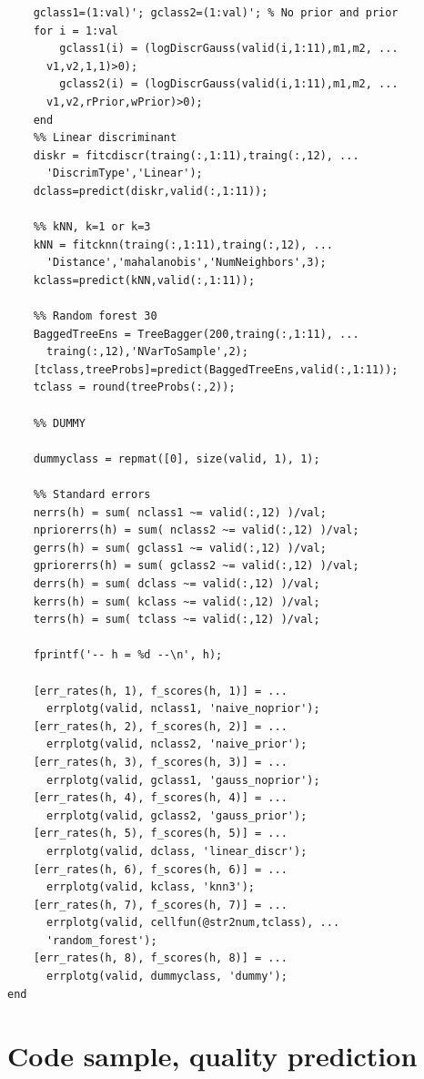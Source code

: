 \documentclass[twoside]{article}
\begin{document}
\begin{multicols}{2}
{\begin{verbatim}
    gclass1=(1:val)'; gclass2=(1:val)'; % No prior and prior
    for i = 1:val
        gclass1(i) = (logDiscrGauss(valid(i,1:11),m1,m2, ... 
	  v1,v2,1,1)>0);
        gclass2(i) = (logDiscrGauss(valid(i,1:11),m1,m2, ...
	  v1,v2,rPrior,wPrior)>0);
    end 
    %% Linear discriminant
    diskr = fitcdiscr(traing(:,1:11),traing(:,12), ...
      'DiscrimType','Linear');
    dclass=predict(diskr,valid(:,1:11));

    %% kNN, k=1 or k=3
    kNN = fitcknn(traing(:,1:11),traing(:,12), ...
      'Distance','mahalanobis','NumNeighbors',3);
    kclass=predict(kNN,valid(:,1:11));

    %% Random forest 30
    BaggedTreeEns = TreeBagger(200,traing(:,1:11), ...
      traing(:,12),'NVarToSample',2);
    [tclass,treeProbs]=predict(BaggedTreeEns,valid(:,1:11));
    tclass = round(treeProbs(:,2));
    
    %% DUMMY

    dummyclass = repmat([0], size(valid, 1), 1);

    %% Standard errors
    nerrs(h) = sum( nclass1 ~= valid(:,12) )/val;
    npriorerrs(h) = sum( nclass2 ~= valid(:,12) )/val;
    gerrs(h) = sum( gclass1 ~= valid(:,12) )/val;
    gpriorerrs(h) = sum( gclass2 ~= valid(:,12) )/val;
    derrs(h) = sum( dclass ~= valid(:,12) )/val;
    kerrs(h) = sum( kclass ~= valid(:,12) )/val;
    terrs(h) = sum( tclass ~= valid(:,12) )/val;

    fprintf('-- h = %d --\n', h);

    [err_rates(h, 1), f_scores(h, 1)] = ... 
      errplotg(valid, nclass1, 'naive_noprior');
    [err_rates(h, 2), f_scores(h, 2)] = ...
      errplotg(valid, nclass2, 'naive_prior');
    [err_rates(h, 3), f_scores(h, 3)] = ...
      errplotg(valid, gclass1, 'gauss_noprior');
    [err_rates(h, 4), f_scores(h, 4)] = ...
      errplotg(valid, gclass2, 'gauss_prior');
    [err_rates(h, 5), f_scores(h, 5)] = ...
      errplotg(valid, dclass, 'linear_discr');
    [err_rates(h, 6), f_scores(h, 6)] = ...
      errplotg(valid, kclass, 'knn3');
    [err_rates(h, 7), f_scores(h, 7)] = ...
      errplotg(valid, cellfun(@str2num,tclass), ...
      'random_forest');
    [err_rates(h, 8), f_scores(h, 8)] = ...
      errplotg(valid, dummyclass, 'dummy');
end

\end{verbatim}

}

\section{Code sample, quality prediction}\label{appendix:qualitycode}


\end{multicols}
\end{document}
